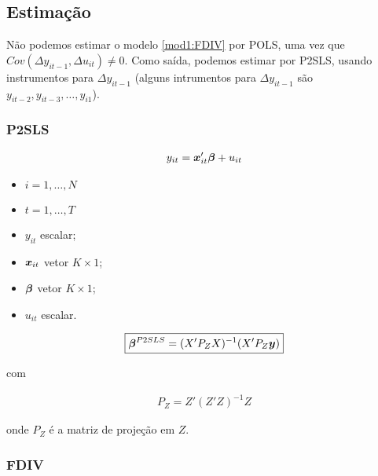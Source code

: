 \documentclass[11pt, oneside, a4paper, article]{article}
\numberwithin{equation}{section}
\begin{document}
\begin{description}
	\subsection{Estimação}

	Não podemos estimar o modelo \eqref{mod1:FDIV} por POLS, uma vez que $Cov(\Delta y_{it-1}, \Delta u_{it} ) \neq 0$.
	Como saída, podemos estimar por P2SLS, usando instrumentos para $\Delta y_{it-1}$ (alguns intrumentos para $\Delta y_{it-1}$ são $y_{it-2}, y_{it-3}, \dots, y_{i1}$).

	\subsubsection{P2SLS}

	\vspace{-1 em}
	\begin{align*}
		y_{it} = \boldsymbol{x}_{it}' \boldsymbol{\beta} + u_{it}
	\end{align*}

	\begin{itemize}\itemsep0pt
		\item $i = 1, \dots, N$
		\item $t = 1, \dots, T$
		\item $y_{it}$ escalar;
		\item $\boldsymbol{x}_{it}$  vetor $K \times 1$;
		\item $\boldsymbol{\beta}$ vetor $K \times 1$;
		\item $u_{it}$ escalar.
	\end{itemize}

	\vspace{-1 em}
	\begin{align*}
		\boxed{
		\boldsymbol{\beta}^{P2SLS} =  ( X' P_{Z} X )^{-1} ( X' P_{Z} \boldsymbol{y} ) }
	\end{align*}

	\noindent
	com

	\vspace{-1 em}
	\begin{align*}
		\boxed{P_{Z} = Z'(Z'Z)^{-1}Z }
	\end{align*}

	\noindent
	onde
	$P_{Z}$ é a matriz de projeção em $Z$.

	\subsubsection{FDIV}


\end{description}
\end{document}
